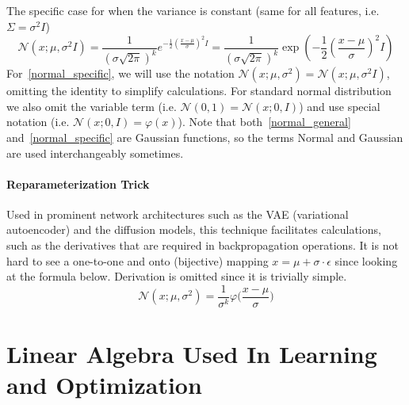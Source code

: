\documentclass{article}
\numberwithin{equation}{subsection}
\begin{document}
The specific case for when the variance is constant (same for all features, i.e. $\Sigma = \sigma^2 I$)
\begin{equation}
    \mathcal{N}(x; \mu, \sigma^2I)=\frac {1}{(\sigma\sqrt{2\pi})^k} e^{-{\frac {1}{2}}\left(\frac {x-\mu}{\sigma}\right)^2 I}=\frac {1}{(\sigma\sqrt{2\pi})^k} \exp\left(-{\frac {1}{2}}\left(\frac {x-\mu}{\sigma}\right)^2 I\right) \label{normal_specific}
\end{equation}
For~\ref{normal_specific}, we will use the notation $\mathcal{N}(x; \mu, \sigma^2) = \mathcal{N}(x; \mu, \sigma^2I)$, omitting the identity to simplify calculations. For standard normal distribution we also omit the variable term (i.e. $\mathcal{N}(0, 1)=\mathcal{N}(x; 0, I)$) and use special notation (i.e. $\mathcal{N}(x; 0, I)=\mathcal{\varphi}(x)$). Note that both~\ref{normal_general} and~\ref{normal_specific} are Gaussian functions, so the terms Normal and Gaussian are used interchangeably sometimes.
\paragraph{Reparameterization Trick}
\label{reparam_trick}
Used in prominent network architectures such as the VAE (variational autoencoder) and the diffusion models, this technique facilitates calculations, such as the derivatives that are required in backpropagation operations. It is not hard to see a one-to-one and onto (bijective) mapping $x=\mu+\sigma \cdot \epsilon$ since looking at the formula below. Derivation is omitted since it is trivially simple.
\begin{equation}
    \mathcal{N}(x;\mu, \sigma^2) = \frac{1}{\sigma^k}\varphi\Big(\frac{x-\mu}{\sigma}\Big)
\end{equation}
\section{Linear Algebra Used In Learning and Optimization}
\end{document}
